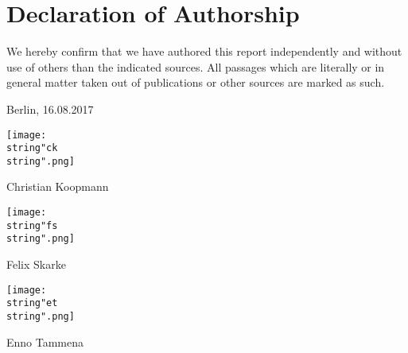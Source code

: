 \clearpage
\section*{Declaration of Authorship}

We hereby confirm that we have authored this report independently and without use of others than the indicated
sources. All passages which are literally or in general matter
taken out of publications or other sources are marked as such.
\vspace{1cm}

Berlin, 16.08.2017 \vspace{0.5cm}


\texttt{[image: \\string"ck\\string".png]}

Christian Koopmann


\texttt{[image: \\string"fs\\string".png]}

Felix Skarke

\texttt{[image: \\string"et\\string".png]}

Enno Tammena
